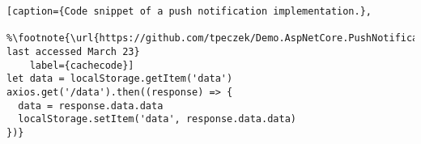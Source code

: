 \begin{minipage}{0.95\linewidth}
    \begin{lstlisting}[caption={Code snippet of a push notification implementation.},
    %\footnote{\url{https://github.com/tpeczek/Demo.AspNetCore.PushNotifications/blob/main/Demo.AspNetCore.PushNotifications.Services.PushService/PushServicePushNotificationService.cs} last accessed March 23}
    label={cachecode}]
let data = localStorage.getItem('data')
axios.get('/data').then((response) => {
  data = response.data.data
  localStorage.setItem('data', response.data.data)
})}
\end{lstlisting}
\end{minipage}